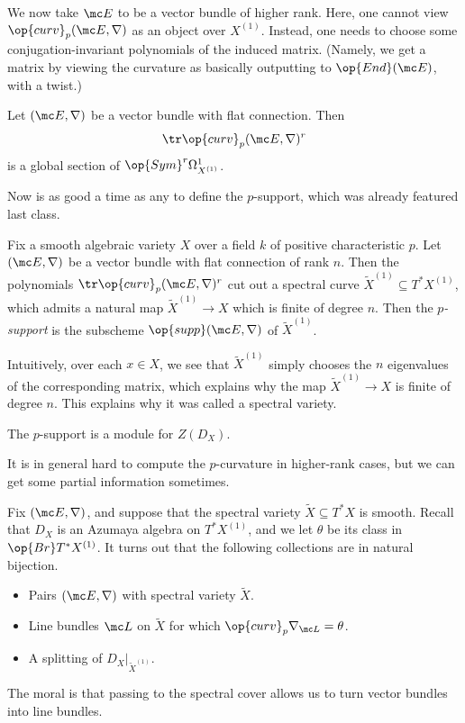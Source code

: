 \documentclass[../notes.tex]{subfiles}
\begin{document}
We now take $\mc E$ to be a vector bundle of higher rank. Here, one cannot view $\op{curv}_p(\mc E,\nabla)$ as an object over $X^{(1)}$. Instead, one needs to choose some conjugation-invariant polynomials of the induced matrix. (Namely, we get a matrix by viewing the curvature as basically outputting to $\op{End}(\mc E)$, with a twist.)
\begin{example}
	Let $(\mc E,\nabla)$ be a vector bundle with flat connection. Then
	\[\tr\op{curv}_p(\mc E,\nabla)^r\]
	is a global section of $\op{Sym}^r\Omega^1_{X^{(1)}}$.
\end{example}
Now is as good a time as any to define the $p$-support, which was already featured last class.
\begin{definition}[support]
	Fix a smooth algebraic variety $X$ over a field $k$ of positive characteristic $p$. Let $(\mc E,\nabla)$ be a vector bundle with flat connection of rank $n$. Then the polynomials $\tr\op{curv}_p(\mc E,\nabla)^r$ cut out a spectral curve $\widetilde X^{(1)}\subseteq T^*X^{(1)}$, which admits a natural map $\widetilde X^{(1)}\to X$ which is finite of degree $n$. Then the \textit{$p$-support} is the subscheme $\op{supp}(\mc E,\nabla)$ of $\widetilde X^{(1)}$.
\end{definition}
\begin{remark}
	Intuitively, over each $x\in X$, we see that $\widetilde X^{(1)}$ simply chooses the $n$ eigenvalues of the corresponding matrix, which explains why the map $\widetilde X^{(1)}\to X$ is finite of degree $n$. This explains why it was called a spectral variety.
\end{remark}
\begin{remark}
	The $p$-support is a module for $Z(D_X)$.
\end{remark}
It is in general hard to compute the $p$-curvature in higher-rank cases, but we can get some partial information sometimes.
\begin{remark}
	Fix $(\mc E,\nabla)$, and suppose that the spectral variety $\widetilde X\subseteq T^*X$ is smooth. Recall that $D_X$ is an Azumaya algebra on $T^*X^{(1)}$, and we let $\theta$ be its class in $\op{Br}T^*X^{(1)}$. It turns out that the following collections are in natural bijection.
	\begin{itemize}
		\item Pairs $(\mc E,\nabla)$ with spectral variety $\widetilde X$.
		\item Line bundles $\mc L$ on $\widetilde X$ for which $\op{curv}_p\nabla_{\mc L}=\theta$.
		\item A splitting of $D_X|_{\widetilde X^{(1)}}$.
	\end{itemize}
	The moral is that passing to the spectral cover allows us to turn vector bundles into line bundles.
\end{remark}
\end{document}
